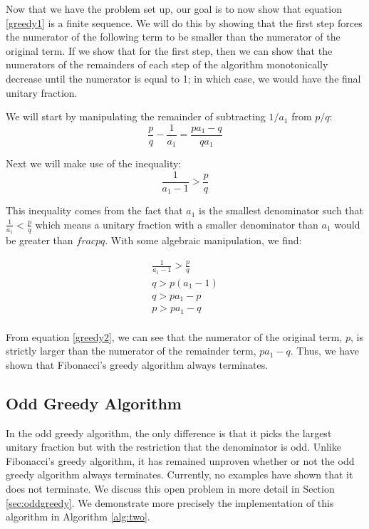 \documentclass[paper=a4, fontsize=11pt]{scrartcl}
\numberwithin{equation}{section}	 %
\numberwithin{figure}{section}	 %
\numberwithin{table}{section}	 %
\begin{document}
Now that we have the problem set up, our goal is to now show that equation \ref{greedy1} is a finite sequence. We will do this by showing that the first step forces the numerator of the following term to be smaller than the numerator of the original term. If we show that for the first step, then we can show that the numerators of the remainders of each step of the algorithm monotonically decrease until the numerator is equal to 1; in which case, we would have the final unitary fraction.

We will start by manipulating the remainder of subtracting $1/a_1$ from $p/q$:
\begin{equation}
	\frac{p}{q} - \frac{1}{a_1} = \frac{pa_1 - q}{qa_1}
\end{equation}

Next we will make use of the inequality:
\begin{equation}
	\frac{1}{a_1 - 1} > \frac{p}{q}
\end{equation}

This inequality comes from the fact that $a_1$ is the smallest denominator such that $\frac{1}{a_1} < \frac{p}{q}$ which means a unitary fraction with a smaller denominator than $a_1$ would be greater than $frac{p}{q}$. With some algebraic manipulation, we find:

\begin{equation}\label{greedy2}
\begin{split}
	\frac{1}{a_1 - 1} > \frac{p}{q} \\
	q > p(a_1 - 1) \\
	q > pa_1 - p \\
	p > pa_1 - q \\
\end{split}
\end{equation}

From equation \ref{greedy2}, we can see that the numerator of the original term, $p$, is strictly larger than the numerator of the remainder term, $pa_1 - q$. Thus, we have shown that Fibonacci’s greedy algorithm always terminates.

\subsection{Odd Greedy Algorithm}
In the odd greedy algorithm, the only difference is that it picks the largest unitary fraction but with the restriction that the denominator is odd. Unlike Fibonacci's greedy algorithm, it has remained unproven whether or not the odd greedy algorithm always terminates. Currently, no examples have shown that it does not terminate. We discuss this open problem in more detail in Section \ref{sec:oddgreedy}. We demonstrate more precisely the implementation of this algorithm in Algorithm \ref{alg:two}.
\end{document}
